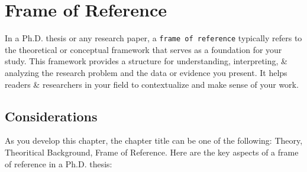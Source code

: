 \chapter{Frame of Reference}
\label{chapter:theory}

In a Ph.D. thesis or any research paper, a \texttt{frame of reference}  typically refers to the theoretical or conceptual framework that serves as a foundation for your study. This framework provides a structure for understanding, interpreting, \& analyzing the research problem and the data or evidence you present. It helps readers \& researchers in your field to contextualize and make sense of your work.


\section{Considerations}
As you develop this chapter, the chapter title can be one of the following: Theory, Theoritical Background, Frame of Reference.
Here are the key aspects of a frame of reference in a Ph.D. thesis:


